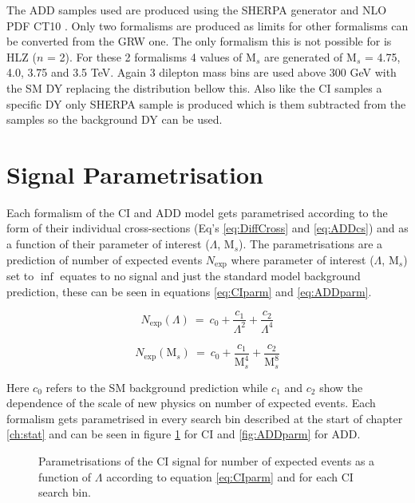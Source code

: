 	{\raggedright The ADD samples used are produced using the SHERPA \cite{} generator and NLO PDF CT10 \cite{}. Only two formalisms are produced as limits for other formalisms can be converted from the GRW one. The only formalism this is not possible for is HLZ ($n$ = 2). For these 2 formalisms 4 values of M$_{s}$ are generated of M$_{s}$ = 4.75, 4.0, 3.75 and 3.5 TeV. Again 3 dilepton mass bins are used above 300 GeV with the SM DY replacing the distribution bellow this. Also like the CI samples a specific DY only SHERPA sample is produced which is them subtracted from the samples so the background DY can be used.}



\section{Signal Parametrisation}
	\label{sec:parm}

	Each formalism of the CI and ADD model gets parametrised according to the form of their individual cross-sections (Eq's \ref{eq:DiffCross} and \ref{eq:ADDcs}) and as a function of their parameter of interest ($\Lambda$, M$_{s}$). The parametrisations are a prediction of number of expected events $N_{\text{exp}}$ where parameter of interest ($\Lambda$, M$_{s}$) set to $\inf$ equates to no signal and just the standard model background prediction, these can be seen in equations \ref{eq:CIparm} and \ref{eq:ADDparm}. 

	\begin{equation}
        N_{\text{exp}}(\Lambda)~=~c_{0} + \frac{c_{1}}{\Lambda^{2}} + \frac{c_{2}}{\Lambda^{4}}
        \label{eq:CIparm}
    \end{equation}

    \begin{equation}
        N_{\text{exp}}(\text{M}_{s})~=~c_{0} + \frac{c_{1}}{\text{M}_{s}^{4}} + \frac{c_{2}}{\text{M}_{s}^{8}}
        \label{eq:ADDparm}
    \end{equation}

	Here $c_{0}$ refers to the SM background prediction while $c_{1}$ and $c_{2}$ show the dependence of the scale of new physics on number of expected events. Each formalism gets parametrised in every search bin described at the start of chapter \ref{ch:stat} and can be seen in figure \ref{fig:CIparm} for CI and \ref{fig:ADDparm} for ADD.


	\begin{figure}[h]
	    \begin{center}
	    \end{center}
	   \caption{Parametrisations of the CI signal for number of expected events as a function of $\Lambda$ according to equation \ref{eq:CIparm} and for each CI search bin.}
	   \label{fig:CIparm}
	\end{figure}

